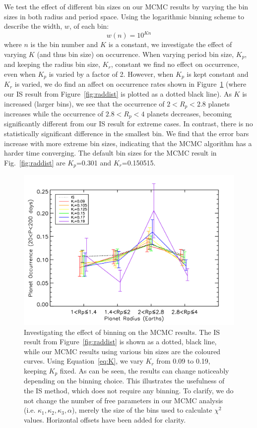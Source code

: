 We test the effect of 
different bin sizes on our MCMC results 
by varying the bin sizes in both radius and period space. Using the
logarithmic binning scheme to describe the width, $w$, of each bin:
\begin{equation}
w(n) = 10^{Kn}
\label{eq:K}
\end{equation}
where $n$ is the bin number and $K$ is a constant, we 
investigate the effect of varying $K$ (and thus bin size) on occurrence.  
When varying period bin size, $K_p$, and keeping the radius bin size, $K_r$, 
constant we find no effect on occurrence, even when $K_p$ is varied by a factor 
of 2. However, when $K_p$ is kept constant and $K_r$ is varied, we do find an affect on  
occurrence rates shown in Figure~\ref{fig:bintest} (where our IS result from 
Figure~\ref{fig:raddist} is plotted as a dotted black line). 
As $K$ is increased (larger bins), we see that the occurrence of $2<R_p<2.8$\rearth{} planets 
increases while the occurrence of $2.8<R_p<4$\rearth{} planets decreases, becoming 
significantly different from our IS result for extreme cases. In contrast, there is no statistically 
significant difference in the smallest bin. We find that 
the error bars increase with more extreme bin sizes, indicating that the MCMC algorithm
has a harder time converging. The default bin sizes for the MCMC result in
Fig.~\ref{fig:raddist} are $K_p$=0.301 and $K_r$=0.150515.

\begin{figure}
\centerline{\includegraphics[scale=0.55]{chap2/Silburt_mcmcbin_decRp3.pdf}}
\caption{Investigating the effect of binning on the MCMC results. The IS result from Figure~\ref{fig:raddist} is shown as a dotted, black line, 
while our MCMC results using various bin sizes are the coloured curves. Using
Equation~\ref{eq:K}, we vary $K_r$ from 0.09 to 0.19, keeping $K_p$ fixed. 
As can be seen, the results can change noticeably depending on
the binning choice. This illustrates the usefulness of the IS method, which does not 
require any binning. To clarify, we do not change the number of free parameters in our
MCMC analysis (i.e. $\kappa_1, \kappa_2, \kappa_3, \alpha$), merely the size of the
bins used to calculate $\chi^2$ values. Horizontal offsets have been added for clarity.}
\label{fig:bintest}
\end{figure}

